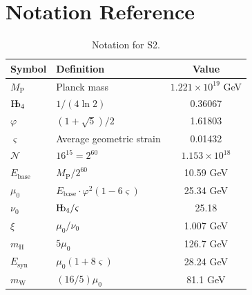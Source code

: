 \documentclass[11pt,a4paper]{article}
\theoremstyle{definition}
\theoremstyle{remark}
\newcommand{\Hb}{\textnormal{H\kern-0.3em b}}
\newcommand{\Hbfour}{\Hb_4}
\newcommand{\gr}{\varphi}
\newcommand{\gs}{\varsigma}
\newcommand{\murad}{\mu_0}
\newcommand{\nurad}{\nu_0}
\newcommand{\Mpl}{M_{\mathrm{P}}}
\newcommand{\Esyn}{E_{\mathrm{syn}}}
\newcommand{\mH}{m_\mathrm{H}}
\newcommand{\mW}{m_\mathrm{W}}
\newcommand{\Ebase}{E_{\mathrm{base}}}
\newcommand{\NN}{\mathcal{N}}
\begin{document}
\section{Notation Reference}
\label{sec:notation}

\begin{table}[H]
\centering
\begin{tabular}{llc}
\toprule
\textbf{Symbol} & \textbf{Definition} & \textbf{Value} \\
\midrule
$\Mpl$ & Planck mass & $1.221 \times 10^{19}$ GeV \\
$\Hbfour$ & $1/(4\ln 2)$ & 0.36067 \\
$\gr$ & $(1+\sqrt{5})/2$ & 1.61803 \\
$\gs$ & Average geometric strain & 0.01432 \\
$\NN$ & $16^{15} = 2^{60}$ & $1.153 \times 10^{18}$ \\
$\Ebase$ & $\Mpl / 2^{60}$ & 10.59 GeV \\
$\murad$ & $\Ebase \cdot \gr^2(1-6\gs)$ & 25.34 GeV \\
$\nurad$ & $\Hbfour / \gs$ & 25.18 \\
$\xi$ & $\murad / \nurad$ & 1.007 GeV \\
$\mH$ & $5\murad$ & 126.7 GeV \\
$\Esyn$ & $\murad(1+8\gs)$ & 28.24 GeV \\
$\mW$ & $(16/5)\murad$ & 81.1 GeV \\
\bottomrule
\end{tabular}
\caption{Notation for S2.}
\label{tab:notation}
\end{table}




\end{document}
